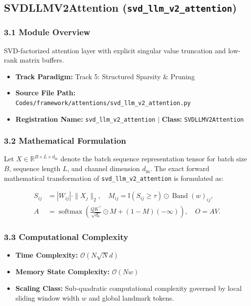 \subsection{SVDLLMV2Attention (\texttt{svd\_llm\_v2\_attention})}
\label{sec:app_module_svd\_llm\_v2\_attention}

\subsubsection*{3.1 Module Overview}
SVD-factorized attention layer with explicit singular value truncation and low-rank matrix buffers.
\begin{itemize}
    \item \textbf{Track Paradigm:} Track 5: Structured Sparsity & Pruning
    \item \textbf{Source File Path:} \texttt{Codes/framework/attentions/svd\_llm\_v2\_attention.py}
    \item \textbf{Registration Name:} \texttt{svd\_llm\_v2\_attention} $\mid$ \textbf{Class:} \texttt{SVDLLMV2Attention}
\end{itemize}

\subsubsection*{3.2 Mathematical Formulation}
Let $X \in \mathbb{R}^{B \times L \times d_{\text{in}}}$ denote the batch sequence representation tensor for batch size $B$, sequence length $L$, and channel dimension $d_{\text{in}}$. The exact forward mathematical transformation of \texttt{svd\_llm\_v2\_attention} is formulated as:

\begin{align}
S_{ij} &= |W_{ij}| \cdot \|X_j\|_2, \quad M_{ij} = \mathbb{I}(S_{ij} \ge \tau) \odot \operatorname{Band}(w)_{ij}, \\
A &= \operatorname{softmax}\left(\frac{Q K^\top}{\sqrt{d_k}} \odot M + (1 - M)(-\infty)\right), \quad O = A V.
\end{align}


\subsubsection*{3.3 Computational Complexity}
\begin{itemize}
    \item \textbf{Time Complexity:} $\mathcal{O}(N \sqrt{N} d)$
    \item \textbf{Memory State Complexity:} $\mathcal{O}(N w)$
    \item \textbf{Scaling Class:} Sub-quadratic computational complexity governed by local sliding window width $w$ and global landmark tokens.
\end{itemize}

